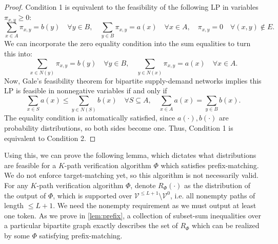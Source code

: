 \documentclass{article}
\theoremstyle{plain}
\theoremstyle{definition}
\theoremstyle{remark}
\newcommand{\V}{\mathcal{V}}
\begin{document}
\begin{proof}
    Condition 1 is equivalent to the feasibility of the following LP in variables $\pi_{x,y} \geq 0$:
    \begin{equation}
        \sum_{x \in A} \pi_{x,y} = b(y) \quad \forall y \in B, \quad \sum_{y \in B} \pi_{x,y} = a(x) \quad \forall x \in A, \quad \pi_{x,y} = 0 \quad \forall (x,y)\not \in E.
    \end{equation}
    We can incorporate the zero equality condition into the sum equalities to turn this into:
    \begin{equation}
        \sum_{x \in N(y)} \pi_{x,y} = b(y) \quad \forall y \in B, \quad \sum_{y \in N(x)} \pi_{x,y} = a(x) \quad \forall x \in A.
    \end{equation}
    Now, Gale's feasibility theorem for bipartite supply-demand networks \citep{gale1957theorem} implies this LP is feasible in nonnegative variables if and only if
    \begin{equation}
        \sum_{x \in S} a(x) \leq \sum_{y \in N(S)} b(x) \quad \forall S \subseteq A, \quad \sum_{x \in A} a(x) = \sum_{y \in B} b(x).
    \end{equation}
    The equality condition is automatically satisfied, since $a(\cdot),b(\cdot)$ are probability distributions, so both sides become one. Thus, Condition 1 is equivalent to Condition 2.
\end{proof}


Using this, we can prove the following lemma, which dictates what distributions are feasible for a $K$-path verification algorithm $\Phi$ which satisfies prefix-matching. We do not enforce target-matching yet, so this algorithm is not necessarily valid. For any $K$-path verification algorithm $\Phi$, denote $R_\Phi(\cdot)$ as the distribution of the output of $\Phi$, which is supported over $\V^{\leq L+1} \setminus \V^0$, i.e. all nonempty paths of length $\leq L+1$. We need the nonempty requirement as we must output at least one token. As we prove in \cref{lem:prefix}, a collection of subset-sum inequalities over a particular bipartite graph exactly describes the set of $R_\Phi$ which can be realized by some $\Phi$ satisfying prefix-matching.
\end{document}
